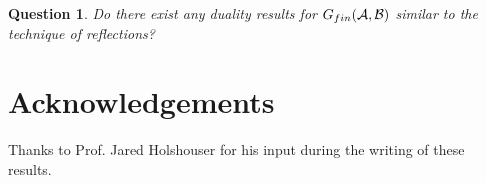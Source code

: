 \documentclass{amsart}
\theoremstyle{plain}
\newtheorem{question}[theorem]{Question}
\theoremstyle{definition}
\theoremstyle{remark}
\theoremstyle{plain}
\theoremstyle{definition}
\theoremstyle{remark}
\begin{document}
\begin{question}
  Do there exist any duality results for \(G_{fin}(\mathcal{A},\mathcal{B})\) similar to the technique
  of reflections?
\end{question}

\section{Acknowledgements}

Thanks to Prof. Jared Holshouser for his input during the writing of these results.



\end{document}
